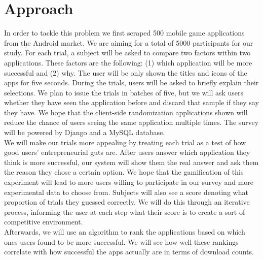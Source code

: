 \section{Approach}

In order to tackle this problem we first scraped 500 mobile game applications from the Android market. We are aiming for a total of 5000 participants for our study. For each trial, a subject will be asked to compare two factors within two applications.  These factors are the following: (1) which application will be more successful and (2) why. The user will be only shown the titles and icons of the apps for five\?\? seconds. During the trials, users will be asked to briefly explain their selections. We plan to issue the trials in batches of five, but we will ask users whether they have seen the application before and discard that sample if they say they have. We hope that the client-side randomization applications shown will reduce the chance of users seeing the same application multiple times. The survey will be powered by Django and a MySQL database.\\

We will make our trials more appealing by treating each trial as a test of how good users' entrepreneurial guts are. After users answer which application they think is more successful, our system will show them the real answer and ask them the reason they chose a certain option. We hope that the gamification of this experiment will lead to more users willing to participate in our survey and more experimental data to choose from. Subjects will also see a score denoting what proportion of trials they guessed correctly. We will do this through an iterative process, informing the user at each step what their score is to create a sort of competitive environment.\\

Afterwards, we will use an algorithm to rank the applications based on which ones users found to be more successful. We will see how well these rankings correlate with how successful the apps actually are in terms of download counts.


